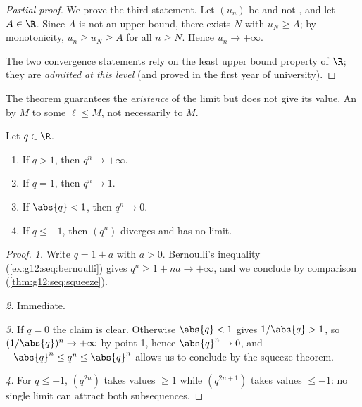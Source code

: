 \begin{proof}[Partial proof]
We prove the third statement. Let $(u_n)$ be  and not , and let $A \in \R$. Since $A$ is not an upper bound, there exists $N$
with $u_N \geq A$; by monotonicity, $u_n \geq u_N \geq A$ for all $n \geq N$.
Hence $u_n \to +\infty$.

The two convergence statements rely on the least upper bound property of
$\R$; they are \emph{admitted at this level} (and proved in the first year of
university).
\end{proof}

\begin{remark}
The theorem guarantees the \emph{existence} of the limit but does not give
its value. An    by $M$  to some
$\ell \leq M$, not necessarily to $M$.
\end{remark}

\begin{theorem}\label{thm:g12:seq:geometric}
Let $q \in \R$.
\begin{enumerate}
  \item If $q > 1$, then $q^n \to +\infty$.
  \item If $q = 1$, then $q^n \to 1$.
  \item If $\abs{q} < 1$, then $q^n \to 0$.
  \item If $q \leq -1$, then $(q^n)$ diverges and has no limit.
\end{enumerate}
\end{theorem}

\begin{proof}
\emph{1.} Write $q = 1 + a$ with $a > 0$. Bernoulli's inequality
(\cref{ex:g12:seq:bernoulli}) gives $q^n \geq 1 + na \to +\infty$, and we
conclude by comparison (\cref{thm:g12:seq:squeeze}).

\emph{2.} Immediate.

\emph{3.} If $q = 0$ the claim is clear. Otherwise $\abs{q} < 1$ gives
$1/\abs{q} > 1$, so $(1/\abs{q})^n \to +\infty$ by point 1, hence
$\abs{q}^n \to 0$, and $-\abs{q}^n \leq q^n \leq \abs{q}^n$ allows us to
conclude by the squeeze theorem.

\emph{4.} For $q \leq -1$, $(q^{2n})$ takes values $\geq 1$ while
$(q^{2n+1})$ takes values $\leq -1$: no single limit can attract both
subsequences.
\end{proof}

